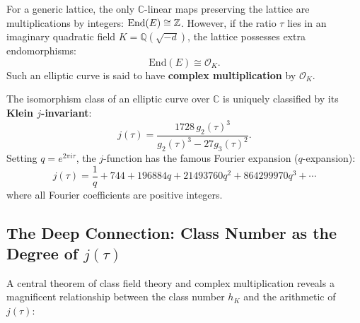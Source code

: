 \documentclass[a4paper]{article}
\begin{document}
For a generic lattice, the only $\mathbb{C}$-linear maps preserving the lattice are multiplications by integers: $\mathrm{End}(E) \cong \mathbb{Z}$. However, if the ratio $\tau$ lies in an imaginary quadratic field $K = \mathbb{Q}(\sqrt{-d})$, the lattice possesses extra endomorphisms:
\begin{equation}
 \mathrm{End}(E) \cong \mathcal{O}_K.
\end{equation}
Such an elliptic curve is said to have \textbf{complex multiplication} by $\mathcal{O}_K$.

The isomorphism class of an elliptic curve over $\mathbb{C}$ is uniquely classified by its \textbf{Klein $j$-invariant}:
\begin{equation}
 j(\tau) = \frac{1728 \, g_2(\tau)^3}{g_2(\tau)^3 - 27 g_3(\tau)^2}.
\end{equation}
Setting $q = e^{2\pi i \tau}$, the $j$-function has the famous Fourier expansion ($q$-expansion):
\begin{equation}
 j(\tau) = \frac{1}{q} + 744 + 196884 q + 21493760 q^2 + 864299970 q^3 + \cdots
 \label{eq:j_q_expansion}
\end{equation}
where all Fourier coefficients are positive integers.

\subsection{The Deep Connection: Class Number as the Degree of \texorpdfstring{$j(\tau)$}{j(tau)}}
A central theorem of class field theory and complex multiplication reveals a magnificent relationship between the class number $h_K$ and the arithmetic of $j(\tau)$:
\end{document}
